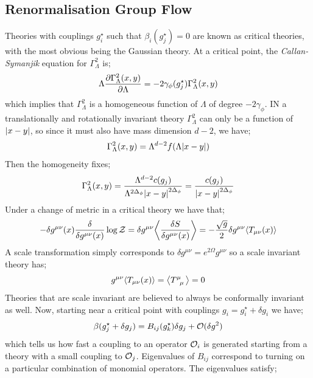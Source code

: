 \subsection{Renormalisation Group Flow}
Theories with couplings $g_i^{\star}$ such that $\beta_i(g_j^{\star}) = 0$ are known as critical theories, with the most obvious being the Gaussian theory. At a critical point, the \emph{Callan-Symanjik} equation for $\Gamma_\Lambda^{2}$ is;
\begin{equation*}
\Lambda \frac{\partial \Gamma^{2}_{\Lambda}(x, y)}{\partial \Lambda} = -2\gamma_\phi (g_j^{\star}) \Gamma_\Lambda^{2}(x, y)
\end{equation*}
which implies that $\Gamma_{\Lambda}^{2}$ is a homogeneous function of $\Lambda$ of degree $-2\gamma_\phi$. IN a translationally and rotationally invariant theory $\Gamma_\Lambda^{2}$ can only be a function of $\abs{x - y}$, so since it must also have mass dimension $d - 2$, we have;
\begin{equation}
\Gamma_{\Lambda}^{2}(x, y) = \Lambda^{d - 2}f(\Lambda\abs{x - y})
\end{equation}
Then the homogeneity fixes;
\begin{equation*}
\Gamma_{\Lambda}^{2}(x, y) = \frac{\Lambda^{d - 2}c(g_j)}{\Lambda^{2 \Delta_\phi}\abs{x - y}^{2\Delta_\phi}} = \frac{c(g_j)}{\abs{x - y}^{2\Delta_\phi}}
\end{equation*}
Under a change of metric in a critical theory we have that;
\begin{equation*}
-\delta g^{\mu\nu}(x)\frac{\delta}{\delta g^{\mu\nu}(x)}\log \mZ = \delta g^{\mu\nu}\left< \frac{\delta S}{\delta g^{\mu\nu}(x)} \right> = -\frac{\sqrt{g}}{2}\delta g^{\mu\nu}\left< T_{\mu\nu}(x) \right>
\end{equation*}
A scale transformation simply corresponds to $\delta g^{\mu\nu} = e^{2\Omega}g^{\mu\nu}$ so a scale invariant theory has;
\begin{equation*}
g^{\mu\nu}\left< T_{\mu\nu}(x) \right> = \left< T\indices{^{\mu}_{\mu}} \right> = 0
\end{equation*}
Theories that are scale invariant are believed to always be conformally invariant as well. Now, starting near a critical point with couplings $g_i = g_i^{\star} + \delta g_i$ we have;
\begin{equation*}
\beta(g_j^{\star} + \delta g_j) = B_{ij}(g_k^{\star}) \delta g_j + \mathcal{O}(\delta g^2)
\end{equation*}
which tells us how fast a coupling to an operator $\mathcal{O}_i$ is generated starting from a theory with a small coupling to $\mathcal{O}_j$. Eigenvalues of $B_{ij}$ correspond to turning on a particular combination of monomial operators. The eigenvalues satisfy;
